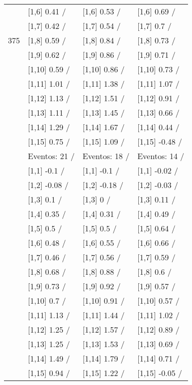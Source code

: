\begin{table}
\begin{tabular}[t]{llll}
 & {}[1,6] 0.41  / & {}[1,6] 0.53  / & {}[1,6] 0.69  /\\
 & {}[1,7] 0.42  / & {}[1,7] 0.54  / & {}[1,7] 0.7  /\\
375 & {}[1,8] 0.59  / & {}[1,8] 0.84  / & {}[1,8] 0.73  /\\
\addlinespace
 & {}[1,9] 0.62  / & {}[1,9] 0.86  / & {}[1,9] 0.71  /\\
 & {}[1,10] 0.59  / & {}[1,10] 0.86  / & {}[1,10] 0.73  /\\
 & {}[1,11] 1.01  / & {}[1,11] 1.38  / & {}[1,11] 1.07  /\\
 & {}[1,12] 1.13  / & {}[1,12] 1.51  / & {}[1,12] 0.91  /\\
 & {}[1,13] 1.11  / & {}[1,13] 1.45  / & {}[1,13] 0.66  /\\
\addlinespace
 & {}[1,14] 1.29  / & {}[1,14] 1.67  / & {}[1,14] 0.44  /\\
 & {}[1,15] 0.75  / & {}[1,15] 1.09  / & {}[1,15] -0.48  /\\
 & Eventos:  21 / & Eventos:  18 / & Eventos:  14 /\\
 & {}[1,1] -0.1  / & {}[1,1] -0.1  / & {}[1,1] -0.02  /\\
 & {}[1,2] -0.08  / & {}[1,2] -0.18  / & {}[1,2] -0.03  /\\
\addlinespace
 & {}[1,3] 0.1  / & {}[1,3] 0  / & {}[1,3] 0.11  /\\
 & {}[1,4] 0.35  / & {}[1,4] 0.31  / & {}[1,4] 0.49  /\\
 & {}[1,5] 0.5  / & {}[1,5] 0.5  / & {}[1,5] 0.64  /\\
 & {}[1,6] 0.48  / & {}[1,6] 0.55  / & {}[1,6] 0.66  /\\
 & {}[1,7] 0.46  / & {}[1,7] 0.56  / & {}[1,7] 0.59  /\\
\addlinespace
500 & {}[1,8] 0.68  / & {}[1,8] 0.88  / & {}[1,8] 0.6  /\\
 & {}[1,9] 0.73  / & {}[1,9] 0.92  / & {}[1,9] 0.57  /\\
 & {}[1,10] 0.7  / & {}[1,10] 0.91  / & {}[1,10] 0.57  /\\
 & {}[1,11] 1.13  / & {}[1,11] 1.44  / & {}[1,11] 1.02  /\\
 & {}[1,12] 1.25  / & {}[1,12] 1.57  / & {}[1,12] 0.89  /\\
\addlinespace
 & {}[1,13] 1.25  / & {}[1,13] 1.53  / & {}[1,13] 0.69  /\\
 & {}[1,14] 1.49  / & {}[1,14] 1.79  / & {}[1,14] 0.71  /\\
 & {}[1,15] 0.94  / & {}[1,15] 1.22  / & {}[1,15] -0.05  /\\
\bottomrule
\end{tabular}
\end{table}
